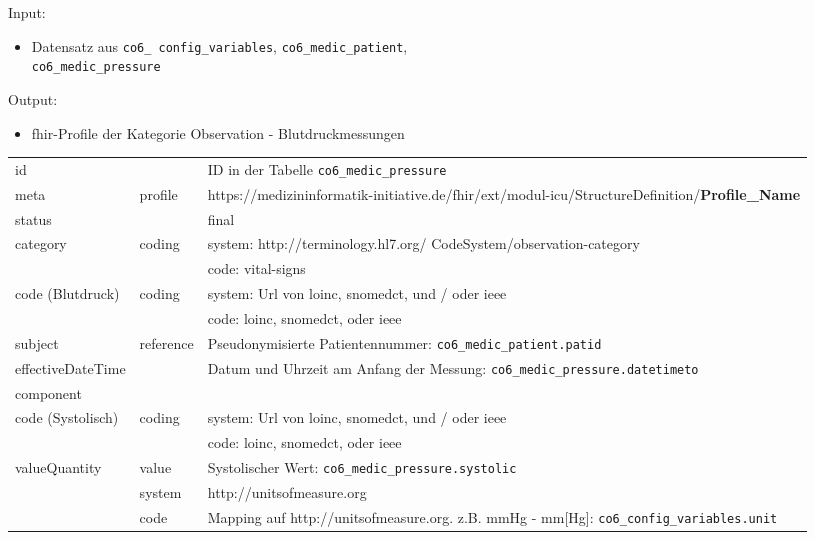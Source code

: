 \vspace{4mm}

\noindent Input:
\begin{itemize}
	\item Datensatz aus \texttt{co6\_ config\_variables}, \texttt{co6\_medic\_patient}, \\ \texttt{co6\_medic\_pressure}
\end{itemize}
Output:
\begin{itemize}
	\item \ac{fhir}-Profile der Kategorie \glqq Observation\grqq{} - Blutdruckmessungen
\end{itemize}
\begin{longtable}{|l|l|p{7cm}|} 
	\hline
	\rowcolor{lightgray} \multicolumn{3}{|l|}{Data Mapping (inhaltlich) - Blutdruckmessungen} \\ \hline
	id &  & ID in der Tabelle \texttt{co6\_medic\_pressure}  \\ \hline
	meta & profile & https://medizininformatik-initiative.de/fhir/ext/modul-icu/StructureDefinition/\textbf{Profile\_Name} \\ \hline 
	status &  & final  \\ \hline 
	category & coding & system: http://terminology.hl7.org/ CodeSystem/observation-category \\ 
	\cline{3-3}
	& & code: vital-signs \\ \hline
	code (Blutdruck) & coding & system: Url von \ac{loinc}, \ac{snomedct}, und / oder \ac{ieee} \\ 
	\cline{3-3} 
	&  & code: \ac{loinc}, \ac{snomedct}, oder \ac{ieee} \\ \hline
	subject & reference & Pseudonymisierte Patientennummer: \texttt{co6\_medic\_patient.patid} \\ \hline
	effectiveDateTime & & Datum und Uhrzeit am Anfang der Messung:  \texttt{co6\_medic\_pressure.datetimeto} \\ \hline
	\multicolumn{3}{|l|}{component} \\ \hline
	code (Systolisch)  & coding & system: Url von \ac{loinc}, \ac{snomedct}, und / oder \ac{ieee} \\ 
	\cline{3-3} 
	&  & code: \ac{loinc}, \ac{snomedct}, oder \ac{ieee} \\ \hline	
	valueQuantity & value & Systolischer Wert: \texttt{co6\_medic\_pressure.systolic} \\
	\cline{2-3}
	& system & http://unitsofmeasure.org \\ 
	\cline{2-3}
	& code & Mapping auf http://unitsofmeasure.org. z.B. mmHg - mm[Hg]: \texttt{co6\_config\_variables.unit} \\ \hline

\end{longtable}
